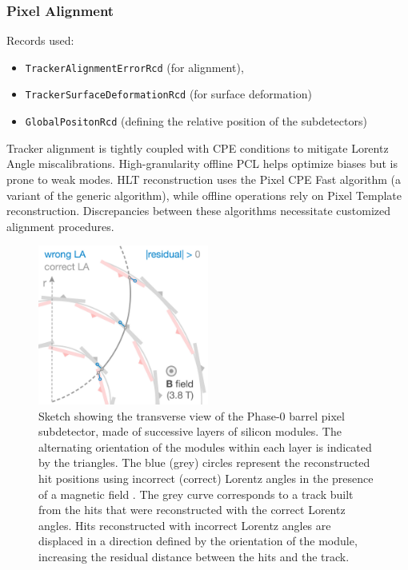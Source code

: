 \subsubsection{Pixel Alignment}
Records used: 
\begin{itemize}
\item \texttt{TrackerAlignmentErrorRcd} (for alignment), 
\item \texttt{TrackerSurfaceDeformationRcd} (for surface deformation)  \item \texttt{GlobalPositonRcd} (defining the relative position of the subdetectors) 
\end{itemize}

Tracker alignment is tightly coupled with CPE conditions to mitigate Lorentz Angle miscalibrations. High-granularity offline PCL helps optimize biases but is prone to weak modes.
HLT reconstruction uses the Pixel CPE Fast algorithm (a variant of the generic algorithm), while offline operations rely on Pixel Template reconstruction. Discrepancies between these algorithms necessitate customized alignment procedures.

\begin{figure}[htbp]
   \centering
	\includegraphics[width=0.5\textwidth]{figures/pixel_alignment_sketch.png}
   \caption{Sketch showing the transverse view of the Phase-0 barrel pixel subdetector, made of successive layers of silicon modules. The alternating orientation of the modules within each layer is indicated by the triangles. The blue (grey) circles represent the reconstructed hit positions using incorrect (correct) Lorentz angles in the presence of a magnetic field . The grey curve corresponds to a track built from the hits that were reconstructed with the correct Lorentz angles. Hits reconstructed with incorrect Lorentz angles are displaced in a direction defined by the orientation of the module, increasing the residual distance between the hits and the track. \cite{CMS:2022ali}}
   \label{fig:pixelAlignment}
\end{figure}

